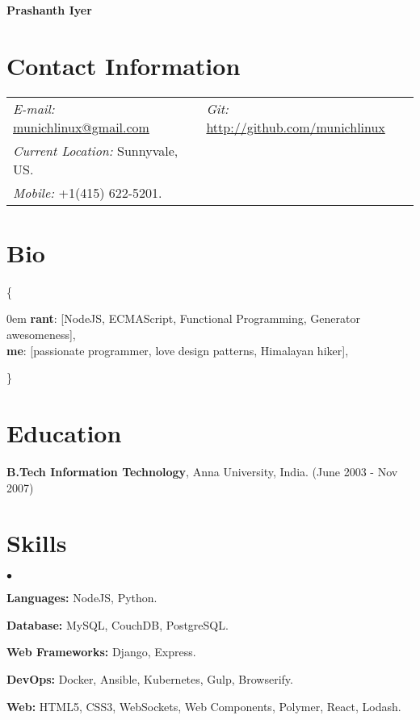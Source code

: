 \documentclass[margin, line, 10pt]{res}
\newenvironment{list2}{
  \begin{list}{$\bullet$}{%
      \setlength{\itemsep}{0in}
      \setlength{\parsep}{0in} \setlength{\parskip}{0in}
      \setlength{\topsep}{0in} \setlength{\partopsep}{0in}
      \setlength{\leftmargin}{0.2in}}}{\end{list}}
\begin{document}
 \textbf{\LARGE Prashanth Iyer}
\vspace{.15cm} \\
\vspace{-.05cm}
\begin{resume}

\section{Contact Information}
\vspace{.05in}
\begin{tabular}{@{}p{3in}p{3in}}
{\it E-mail:} \href{mailto:munichlinux@gmail.com}{munichlinux@gmail.com} & {\it Git:} \href{http://github.com/munichlinux}{http://github.com/munichlinux} \\
{\it Current Location:} Sunnyvale, US. \\
{\it Mobile:}  +1(415) 622-5201.
\end{tabular}

\section{Bio}
\{
  \begin{addmargin}[1em]{0em}
  {\bf rant}: [NodeJS, ECMAScript, Functional Programming, Generator awesomeness],\\
  {\bf me}: [passionate programmer, love design patterns, Himalayan hiker],
  \end{addmargin}
  \vspace{-.15in}
\}

\section{Education}
{\bf B.Tech Information Technology}, Anna University, India. \hfill (June 2003 - Nov 2007)

\section{Skills}
\begin{list2}
\item {\bf Languages:} NodeJS, Python.\\
\vspace{-.3cm}
\item {\bf Database:} MySQL, CouchDB, PostgreSQL.\\
\vspace{-.3cm}
\item {\bf Web Frameworks:} Django, Express.\\
\vspace{-.3cm}
\item {\bf DevOps:} Docker, Ansible, Kubernetes, Gulp, Browserify.\\
\vspace{-.3cm}
\item {\bf Web:} HTML5, CSS3, WebSockets, Web Components, Polymer, React, Lodash.\\
\vspace{-.3cm}
\end{list2}


\end{resume}
\end{document}
